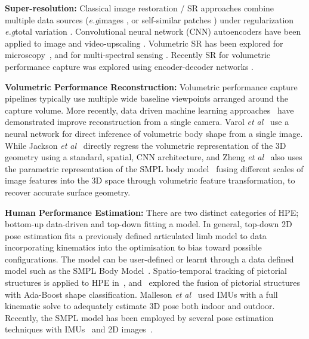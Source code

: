 \documentclass{bmvc2k}
\newcommand{\eg}{e.\,g.\xspace}
\def\eg{\emph{e.g}\bmvaOneDot}
\begin{document}
{\bf Super-resolution:} Classical image restoration / SR approaches combine multiple data sources (\eg images \cite{Fattal2007}, or self-similar patches \cite{Glasner2009,Zhu2014}) under regularization \eg total variation \cite{tvexample}.  Convolutional neural network (CNN) autoencoders have been applied to image \cite{Xie2012,Wang2015,Dong2016} and video-upscaling \cite{Shi2016}. Volumetric SR has been explored for microscopy~\cite{Abrahamsson2017}, and for multi-spectral sensing \cite{Atalay2017}. Recently SR for volumetric performance capture was explored using encoder-decoder networks \cite{gilbert2018volumetric}.

{\bf Volumetric Performance Reconstruction:} Volumetric performance capture pipelines typically use multiple wide baseline viewpoints \cite{starck2009FVVR,casas2014rwvc} arranged around the capture volume.  More recently, data driven machine learning approaches~\cite{VarolECCV18,JacksonECCV18,ZhengICCV19} have demonstrated improve reconstruction from a single camera. Varol \emph{et al}~\cite{VarolECCV18} use a neural network for direct inference of volumetric body shape from a single image. While Jackson \emph{et al}~\cite{JacksonECCV18} directly regress the volumetric representation of the 3D geometry using a standard, spatial, CNN architecture, and Zheng \emph{et al}~\cite{ZhengICCV19} also uses the parametric representation of the SMPL body model~\cite{loper2015SMPL} fusing different scales of image features into the 3D space through volumetric feature transformation, to recover accurate surface geometry. 

{\bf Human Performance Estimation:}  There are two distinct categories of HPE; bottom-up data-driven and top-down fitting a model. In general, top-down 2D pose estimation fits a previously defined articulated limb model to data incorporating kinematics into the optimisation to bias toward possible configurations. The model can be user-defined or learnt through a data defined model such as the SMPL Body Model~\cite{loper2015SMPL}. Spatio-temporal tracking of pictorial structures is applied to HPE in~\cite{lan04}, and~\cite{andriluka09} explored the fusion of pictorial structures with Ada-Boost shape classification. Malleson \emph{et al}~\cite{Malleson3DV17} used IMUs with a full kinematic solve to adequately estimate 3D pose both indoor and outdoor. Recently, the SMPL model has been employed by several pose estimation techniques with IMUs~\cite{SIP2017EG,PonsECCV18} and 2D images~\cite{TanSMPLY2d3DBMVC17,Huang3DV}. 
\end{document}
